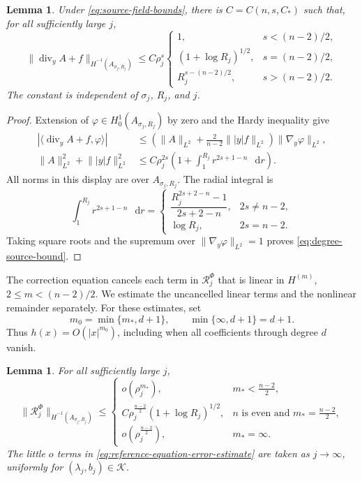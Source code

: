 \documentclass[11pt]{article}
\numberwithin{equation}{section}
\newtheorem{lemma}[theorem]{Lemma}
\theoremstyle{remark}
\newcommand{\norm}[1]{\lVert #1\rVert}
\newcommand{\dd}{\mathop{}\!\mathrm{d}}
\begin{document}
\begin{lemma}\label{lem:degree-source-bound}
Under \eqref{eq:source-field-bounds}, there is \(C=C(n,s,C_*)\) such that,
for all sufficiently large \(j\),
\begin{equation}\label{eq:degree-source-bound}
 \norm{\operatorname{div}_y A+f}_{\dot H^{-1}(A_{\sigma_j,R_j})}
 \le C\rho_j^s
 \begin{cases}
  1,&s<(n-2)/2,\\
  (1+\log R_j)^{1/2},&s=(n-2)/2,\\
  R_j^{s-(n-2)/2},&s>(n-2)/2.
 \end{cases}
\end{equation}
The constant is independent of \(\sigma_j\), \(R_j\), and \(j\).
\end{lemma}

\begin{proof}
Extension of \(\varphi\in H_0^1(A_{\sigma_j,R_j})\) by zero and the Hardy
inequality give
\[
 \begin{aligned}
 |\langle\operatorname{div}_y A+f,\varphi\rangle|
 &\le
 \left(\norm{A}_{L^2}
 +\frac2{n-2}\norm{|y|f}_{L^2}\right)
 \norm{\nabla_y\varphi}_{L^2},\\
 \norm{A}_{L^2}^2+\norm{|y|f}_{L^2}^2
 &\le C\rho_j^{2s}
 \left(1+\int_1^{R_j}r^{2s+1-n}\,\dd r\right).
 \end{aligned}
\]
All norms in this display are over \(A_{\sigma_j,R_j}\).
The radial integral is
\[
 \int_1^{R_j}r^{2s+1-n}\,\dd r
 =\begin{cases}
 \dfrac{R_j^{2s+2-n}-1}{2s+2-n},&2s\ne n-2,\\[4pt]
 \log R_j,&2s=n-2.
 \end{cases}
\]
Taking square roots and the supremum over
\(\norm{\nabla_y\varphi}_{L^2}=1\) proves
\eqref{eq:degree-source-bound}.
\end{proof}

The correction equation cancels each term in \(\mathcal R_j^\Phi\) that is linear in \(H^{(m)}\), \(2\le m<(n-2)/2\).  We estimate the uncancelled linear terms and the
nonlinear remainder separately. For these estimates, set
\[
 m_0=\min\{m_*,d+1\},\qquad \min\{\infty,d+1\}=d+1.
\]
Thus \(h(x)=O(|x|^{m_0})\), including when all coefficients through
degree \(d\) vanish.

\begin{lemma}\label{lem:reference-equation-error-estimate}
For all sufficiently large \(j\),
\begin{equation}\label{eq:reference-equation-error-estimate}
 \norm{\mathcal R_j^\Phi}_{\dot H^{-1}(A_{\sigma_j,R_j})}
 \le\begin{cases}
  o(\rho_j^{m_*}),&m_*<\frac{n-2}{2},\\
  C\rho_j^{\frac{n-2}{2}}(1+\log R_j)^{1/2},&n\text{ is even and }m_*=\frac{n-2}{2},\\
  o(\rho_j^{\frac{n-2}{2}}),&m_*=\infty.
 \end{cases}
\end{equation}
The little \(o\) terms in \eqref{eq:reference-equation-error-estimate} are
taken as \(j\to\infty\), uniformly for
\((\lambda_j,b_j)\in\mathcal K\).
\end{lemma}
\end{document}
